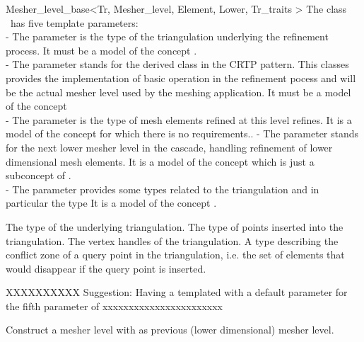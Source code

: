\begin{ccRefClass}{Mesher_level_base<Tr, Mesher_level, Element, Lower,
Tr_traits >}
\ccParameters
The class \ccRefName\ has five template parameters: \\
- The parameter  is the type of the triangulation underlying
 the refinement process. It must be a model of the concept 
 .\\
- The parameter  stands for the derived class
in the CRTP pattern. This classes provides the implementation
of basic operation in  the refinement pocess and will be the actual
mesher level used by the meshing application. 
It must be a model of the concept  \\
- The parameter  is the type of mesh elements 
refined at  this level refines. It is a model of the concept
 for which there is no requirements..
- The parameter  stands for the  next lower  mesher level
 in the cascade, handling refinement of lower dimensional mesh
elements.  It is a model of the concept
 which is just a subconcept of
.\\
- The parameter  provides some types related
to the triangulation and in particular the type  
 It is a model of the concept .




{The type of the underlying triangulation.}
\ccGlue
{}
{The type of points inserted into the triangulation.}
\ccGlue
{}
{ The vertex handles of the triangulation.}
\ccGlue
{}
{A type describing the conflict zone of a query point in the triangulation,
i.e. the set of elements that would disappear if the query point is
inserted.
}

XXXXXXXXXX
Suggestion: Having a templated 
with a default parameter  
for the fifth parameter of   
xxxxxxxxxxxxxxxxxxxxxxx


\ccCreation
{}  %

{Construct a mesher level with  as previous 
(lower dimensional) mesher level.}




\end{ccRefClass}
